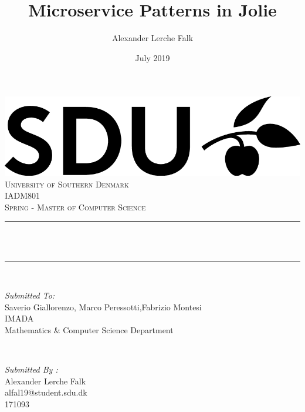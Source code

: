 \documentclass[12pt]{article}
\title{Microservice Patterns in Jolie}						%
\author{Alexander Lerche Falk}				      			%
\date{July 2019}											%
\makeatletter
\let\thetitle\@title
\makeatother
\begin{document}

\begin{titlepage}
	\centering
    \vspace*{0.5 cm}
    \includegraphics[scale = 0.75]{SDU_logo.png}\\[1.0 cm]	%
    \textsc{\LARGE University of Southern Denmark}\\[2.0 cm]	%
    \textsc{\Large IADM801}\\[0.5 cm]				%
    \textsc{\Large Spring - Master of Computer Science}\\[0.5 cm]	%
	\rule{\linewidth}{0.2 mm} \\[0.4 cm]
	{ \huge \bfseries \thetitle}\\
	\rule{\linewidth}{0.2 mm} \\[1.5 cm]
	
	\begin{minipage}{0.4\textwidth}
		\begin{flushleft} \large
			\emph{Submitted To:}\\
			Saverio Giallorenzo, Marco Peressotti,Fabrizio Montesi\\
			IMADA \\
			Mathematics \& Computer Science Department \\
			\end{flushleft}
			\end{minipage}~
			\begin{minipage}{0.4\textwidth}
            
			\begin{flushright} \large
			\emph{Submitted By :} \\
            Alexander Lerche Falk\\
            alfal19@student.sdu.dk\\
            171093\\
            \end{flushright}
        
	\end{minipage}\\[2 cm]
    
	
\end{titlepage}
\end{document}
